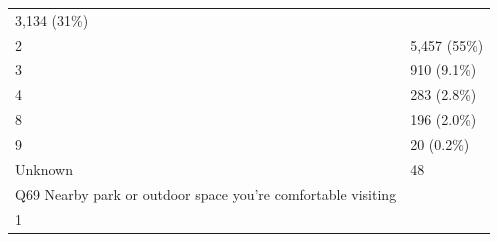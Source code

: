 \documentclass[]{article}
\begin{document}
\begin{longtable}[]{@{}ll@{}}
\begin{minipage}[t]{0.23\columnwidth}
3,134 (31\%)\strut
\end{minipage}\tabularnewline
\begin{minipage}[t]{0.71\columnwidth}\raggedright
2\strut
\end{minipage} & \begin{minipage}[t]{0.23\columnwidth}\raggedright
5,457 (55\%)\strut
\end{minipage}\tabularnewline
\begin{minipage}[t]{0.71\columnwidth}\raggedright
3\strut
\end{minipage} & \begin{minipage}[t]{0.23\columnwidth}\raggedright
910 (9.1\%)\strut
\end{minipage}\tabularnewline
\begin{minipage}[t]{0.71\columnwidth}\raggedright
4\strut
\end{minipage} & \begin{minipage}[t]{0.23\columnwidth}\raggedright
283 (2.8\%)\strut
\end{minipage}\tabularnewline
\begin{minipage}[t]{0.71\columnwidth}\raggedright
8\strut
\end{minipage} & \begin{minipage}[t]{0.23\columnwidth}\raggedright
196 (2.0\%)\strut
\end{minipage}\tabularnewline
\begin{minipage}[t]{0.71\columnwidth}\raggedright
9\strut
\end{minipage} & \begin{minipage}[t]{0.23\columnwidth}\raggedright
20 (0.2\%)\strut
\end{minipage}\tabularnewline
\begin{minipage}[t]{0.71\columnwidth}\raggedright
Unknown\strut
\end{minipage} & \begin{minipage}[t]{0.23\columnwidth}\raggedright
48\strut
\end{minipage}\tabularnewline
\begin{minipage}[t]{0.71\columnwidth}\raggedright
Q69 Nearby park or outdoor space you're comfortable visiting\strut
\end{minipage} & \begin{minipage}[t]{0.23\columnwidth}\raggedright
\strut
\end{minipage}\tabularnewline
\begin{minipage}[t]{0.71\columnwidth}\raggedright
1\strut
\end{minipage} & \begin{minipage}[t]{0.23\columnwidth}\raggedright

\end{minipage}
\end{longtable}
\end{document}
